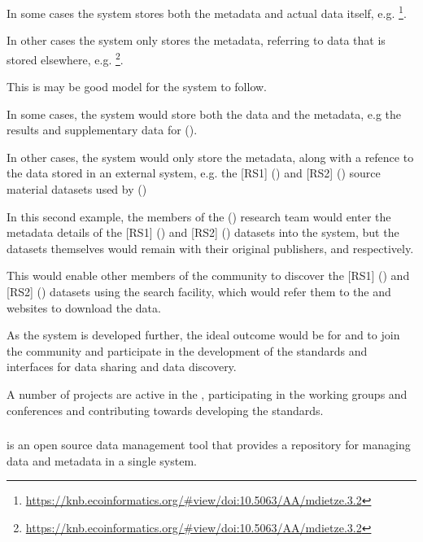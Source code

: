 \documentclass{article}
\begin{document}
In some cases the \cite{knb} system stores both the metadata and actual
data itself, e.g.
\footnote{\url{https://knb.ecoinformatics.org/#view/doi:10.5063/AA/mdietze.3.2}}.

In other cases the \cite{knb} system only stores the metadata,
referring to data that is stored elsewhere, e.g.
\footnote{\url{https://knb.ecoinformatics.org/#view/doi:10.5063/AA/mdietze.3.2}}.

This is may be good model for the \cite{trop} system to follow.

In some cases, the system would store both the data and the metadata,
e.g the results and supplementary data for (\cite{mitchard-2014}).

In other cases, the system would only store the metadata, along with a refence to
the data stored in an external system,
e.g. the [RS1] (\cite{saatchi-2011}) and [RS2] (\cite{baccini-2012}) source material
datasets used by (\cite{mitchard-2014})

In this second example, the members of the
(\cite{mitchard-2014}) research team would enter the metadata details of the 
[RS1] (\cite{saatchi-2011}) and [RS2] (\cite{baccini-2012})
datasets into the \cite{trop} system, but the datasets themselves
would remain with their original publishers, 
and  respectively.

This would enable other members of the \cite{trop} community to discover the 
[RS1] (\cite{saatchi-2011}) and [RS2] (\cite{baccini-2012})
datasets using the \cite{trop} search facility, which would refer them to the
 and  websites to download the data.

As the \cite{trop} system is developed further, the ideal outcome would
be for  and  to join the \cite{trop}
community and participate in the development of the standards and interfaces
for data sharing and data discovery.

A number of \cite{nasa} projects are active in the \cite{ivoa},
participating in the working groups and conferences and contributing
towards developing the \cite{ivoa} standards.

\subsubsection{}

\cite{metacat} is an open source data management tool that provides a
repository for managing data and metadata in a single system.
\end{document}
